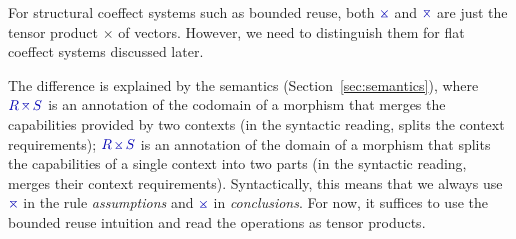 For structural coeffect systems such as bounded reuse, both $\asplit$ and $\amerge$ are
just the tensor product $\times$ of vectors. However, we need to distinguish them for flat coeffect 
systems discussed later. 

The difference is explained by the semantics (Section~\ref{sec:semantics}), where
$\aclrd{R}\,\amerge\,\aclrd{S}$ is an annotation of the codomain of 
a morphism that merges the capabilities provided by two contexts (in the syntactic 
reading, splits the context requirements); $\aclrd{R}\,\asplit\,\aclrd{S}$ is an annotation of
the domain of a morphism that splits the capabilities of a single context into two parts (in the
syntactic reading, merges their context requi\-rements). Syntactically, this means that we always use
$\amerge$ in the rule \emph{assumptions} and $\asplit$ in \emph{conclusions}. For now, it suffices to use the 
bounded reuse intuition and read the operations as tensor products.



